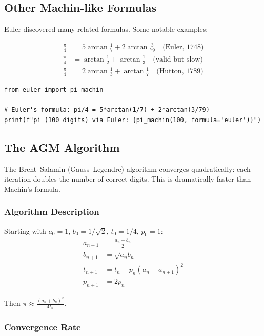 \subsection{Other Machin-like Formulas}

Euler discovered many related formulas. Some notable examples:

\begin{align*}
\frac{\pi}{4} &= 5 \arctan\frac{1}{7} + 2 \arctan\frac{3}{79} \quad \text{(Euler, 1748)} \\
\frac{\pi}{4} &= \arctan\frac{1}{2} + \arctan\frac{1}{3} \quad \text{(valid but slow)} \\
\frac{\pi}{4} &= 2 \arctan\frac{1}{3} + \arctan\frac{1}{7} \quad \text{(Hutton, 1789)}
\end{align*}

\begin{lstlisting}[caption={Euler's pi formula}, label=lst:pi_euler]
from euler import pi_machin

# Euler's formula: pi/4 = 5*arctan(1/7) + 2*arctan(3/79)
print(f"pi (100 digits) via Euler: {pi_machin(100, formula='euler')}")
\end{lstlisting}

\subsection{The AGM Algorithm}

The Brent--Salamin (Gauss--Legendre) algorithm converges quadratically:
each iteration doubles the number of correct digits. This is dramatically faster
than Machin's formula.

\subsubsection{Algorithm Description}

Starting with $a_0 = 1$, $b_0 = 1/\sqrt{2}$, $t_0 = 1/4$, $p_0 = 1$:
\begin{align*}
a_{n+1} &= \frac{a_n + b_n}{2} \\
b_{n+1} &= \sqrt{a_n b_n} \\
t_{n+1} &= t_n - p_n(a_n - a_{n+1})^2 \\
p_{n+1} &= 2p_n
\end{align*}

Then $\pi \approx \frac{(a_n + b_n)^2}{4t_n}$.

\subsubsection{Convergence Rate}

